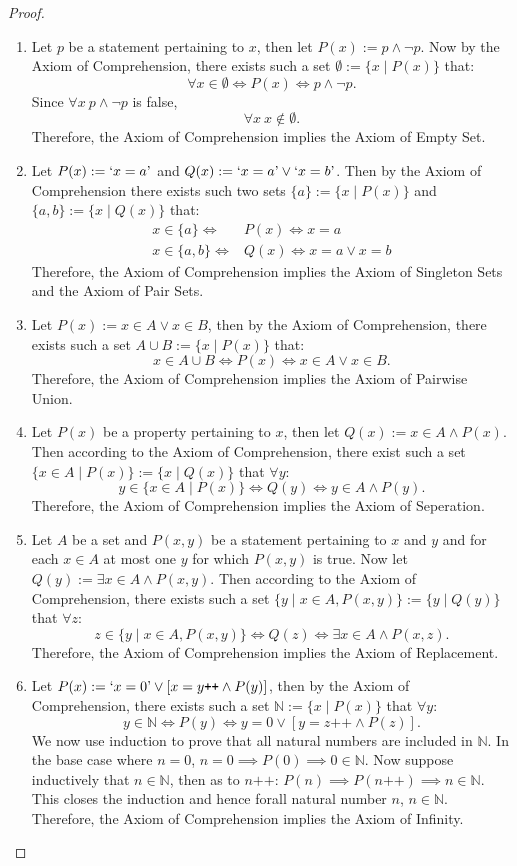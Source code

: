 \documentclass[a4paper]{book}
\newtheorem*{proof}{\textit{Proof.}}
\theoremstyle{break}
\begin{document}
			\begin{proof}~
				\begin{enumerate}[label=($\alph*$)]
					\item Let $p$ be a statement pertaining to $x$, then let $P(x):=p\land\lnot p$. Now by the Axiom of Comprehension, there exists such a set $\emptyset:=\{x\mid P(x)\}$ that: $$\forall x\in\emptyset\iff P(x)\iff p\land\lnot p.$$ Since $\forall x~p\land\lnot p$ is false, $$\forall x~x\notin\emptyset.$$ Therefore, the Axiom of Comprehension implies the Axiom of Empty Set.
					\item Let $P(x):=`x=a\text{'}$ and $Q(x):=`x=a\text{'}\lor`x=b\text{'}$. Then by the Axiom of Comprehension there exists such two sets $\{a\}:=\{x\mid P(x)\}$ and $\{a,b\}:=\{x\mid Q(x)\}$ that:
					$$
					\begin{aligned}
						x\in \{a\}\iff&P(x)\!\iff x=a\\
						x\in \{a,b\}\iff&Q(x)\!\iff x=a\lor x=b
					\end{aligned}
					$$
					Therefore, the Axiom of Comprehension implies the Axiom of Singleton Sets and the Axiom of Pair Sets.
					\item Let $P(x):=x\in A\lor x\in B$, then by the Axiom of Comprehension, there exists such a set $\!A\cup B\!:=\!\{x\!\mid\!P(x)\}$ that: $$x\in A\cup B\iff P(x)\iff x\in A\lor x\in B.$$ Therefore, the Axiom of Comprehension implies the Axiom of Pairwise Union.
					\item Let $P(x)$ be a property pertaining to $x$, then let $Q(x):=x\in A\land P(x)$. Then according to the Axiom of Comprehension, there exist such a set $\{x\in A\mid P(x)\}:=\{x\mid Q(x)\}$ that $\forall y$: $$y\in\{x\in A\mid P(x)\}\iff Q(y)\iff y\in A\land P(y).$$ Therefore, the Axiom of Comprehension implies the Axiom of Seperation.
					\item Let $A$ be a set and $P(x,y)$ be a statement pertaining to $x$ and $y$ and for each $x\in A$ at most one $y$ for which $P(x,y)$ is true. Now let $Q(y):=\exists x\in A\land P(x,y)$. Then according to the Axiom of Comprehension, there exists such a set $\{y\mid x\in A,P(x,y)\}:=\{y\mid Q(y)\}$ that $\forall z$:
					$$z\in\{y\mid x\in A,P(x,y)\}\iff Q(z)\iff\exists x\in A\land P(x,z).$$
					Therefore, the Axiom of Comprehension implies the Axiom of Replacement.
					\item Let $P(x):=`x=0\text{'}\lor[x=y\texttt{++}\land P(y)]$, then by the Axiom of Comprehension, there exists such a set $\mathbb{N}:=\{x\mid P(x)\}$ that $\forall y$: $$y\in\mathbb{N}\iff P(y)\iff y=0\lor[y=z\texttt{++}\land P(z)].$$ We now use induction to prove that all natural numbers are included in $\mathbb{N}$. In the base case where $n=0$, $n=0\implies P(0)\implies 0\in\mathbb{N}$. Now suppose inductively that $n\in\mathbb{N}$, then as to $n\texttt{++}$: $P(n)\implies P(n\texttt{++})\implies n\in\mathbb{N}.$ This closes the induction and hence forall natural number $n$, $n\in\mathbb{N}$.\\
					Therefore, the Axiom of Comprehension implies the Axiom of Infinity.
				\end{enumerate}
			\end{proof}
\end{document}
